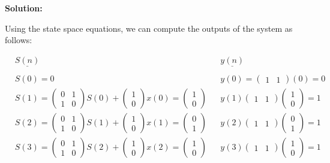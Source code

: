 \documentclass{article}
\newenvironment{solution}{
	\vspace{0.4cm}\par\noindent\large\textbf{{Solution:}}\par\vspace{1em}
}{\vspace{2.5em}}
\begin{document}
\begin{solution}
	Using the state space equations, we can compute the outputs of the system as follows:

	\begin{align*}
		&\underline{S(n)} &&\underline{y(n)} \\\\
		&S(0) = 0 &&y(0) = \begin{pmatrix} 1 & 1\end{pmatrix}(0) = 0 \\
		&S(1) = \begin{pmatrix} 0 & 1 \\ 1 & 0 \end{pmatrix}S(0) + \begin{pmatrix} 1 \\ 0 \end{pmatrix}x(0) = \begin{pmatrix} 1 \\ 0 \end{pmatrix} &&y(1) \begin{pmatrix} 1 & 1 \end{pmatrix}\begin{pmatrix} 1 \\ 0 \end{pmatrix} = 1 \\
		&S(2) = \begin{pmatrix} 0 & 1 \\ 1 & 0 \end{pmatrix}S(1) + \begin{pmatrix} 1 \\ 0 \end{pmatrix}x(1) = \begin{pmatrix} 0 \\ 1 \end{pmatrix} &&y(2) \begin{pmatrix} 1 & 1 \end{pmatrix}\begin{pmatrix} 0 \\ 1 \end{pmatrix} = 1 \\
		&S(3) = \begin{pmatrix} 0 & 1 \\ 1 & 0 \end{pmatrix}S(2) + \begin{pmatrix} 1 \\ 0 \end{pmatrix}x(2) = \begin{pmatrix} 1 \\ 0 \end{pmatrix} &&y(3) \begin{pmatrix} 1 & 1 \end{pmatrix}\begin{pmatrix} 1 \\ 0 \end{pmatrix} = 1 \\
	\end{align*}
\end{solution}
\end{document}
